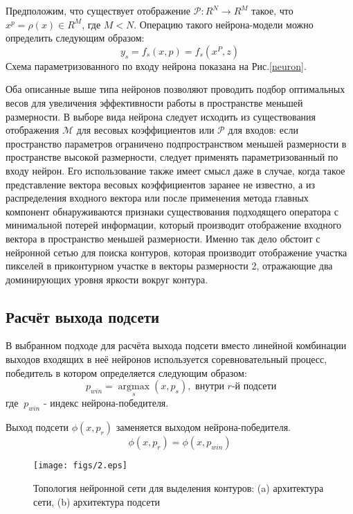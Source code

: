 \documentclass[a4paper,12pt]{report}
\begin{document}
Предположим, что существует отображение $\mathcal{P}\colon R^N\longrightarrow R^M$ такое, что $x^p=\rho(x)\in R^M$, где $M<N$. Операцию такого нейрона-модели можно определить следующим образом:
\begin{equation}
y_s=f_s(x,p)=f_s(x^P,z)
\end{equation}
Схема параметризованного по входу нейрона показана на Рис.\ref{neuron}.

Оба описанные выше типа нейронов позволяют проводить подбор оптимальных весов для увеличения эффективности работы в пространстве меньшей размерности. В выборе вида нейрона следует исходить из существования отображения $\mathcal{M}$ для весовых коэффициентов или $\mathcal{P}$ для входов: если пространство параметров ограничено подпространством меньшей размерности в пространстве высокой размерности, следует применять параметризованный по входу нейрон. Его использование также имеет смысл даже в случае, когда такое представление вектора весовых коэффициентов заранее не известно, а из распределения входного вектора или после применения метода главных компонент обнаруживаются признаки существования подходящего оператора с минимальной потерей информации, который производит отображение входного вектора в пространство меньшей размерности. Именно так дело обстоит с нейронной сетью для поиска контуров, которая производит отображение участка пикселей в приконтурном участке в векторы размерности 2, отражающие два доминирующих уровня яркости вокруг контура. 

\subsection{Расчёт выхода подсети}
В выбранном подходе для расчёта выхода подсети вместо линейной комбинации выходов входящих в неё нейронов используется соревновательный процесс, победитель в котором определяется следующим образом: 
\begin{equation}
\ p_{win}=\underset{s}{\operatorname{argmax}}(x, p_s),\mbox{ внутри $r$-й подсети}
\end{equation}
где  $\ p_{win}$ - индекс нейрона-победителя.

Выход подсети  $\phi(x,p_r)$ заменяется выходом нейрона-победителя.
\begin{equation}
\phi(x,p_r)=\phi(x,p_{win})
\end{equation}

\begin{center}
\begin{figure}[!t]
\begin{center}
\texttt{[image: figs/2.eps]}
\end{center}\caption{Топология нейронной сети для выделения контуров: (a) архитектура сети, (b) архитектура подсети}
\label{subnetwork}
\end{figure}
\end{center}
\end{document}
